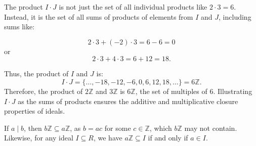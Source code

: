 \noindent
The product $I \cdot J$ is not just the set of all individual products like $2 \cdot 3 = 6$. Instead, it is the set of all sums of products of elements from $I$ and $J$, including sums like:

\[
    2 \cdot 3 + (-2) \cdot 3 = 6 - 6 = 0
\]
or
\[
    2 \cdot 3 + 4 \cdot 3 = 6 + 12 = 18.
\]

Thus, the product of $I$ and $J$ is:
\[
    I \cdot J = \{ \ldots, -18, -12, -6, 0, 6, 12, 18, \ldots \} = 6\mathbb{Z}.
\]
Therefore, the product of $2\mathbb{Z}$ and $3\mathbb{Z}$ is $6\mathbb{Z}$, the set of multiples of 6.
Illustrating $I \cdot J$ as the sums of products ensures the additive and multiplicative closure properties of ideals.
\newpage

\begin{Def}
    If $a \mid b$, then $b\mathbb{Z} \subseteq a\mathbb{Z}$, as $b=ac$
    for some $c \in \mathbb{Z}$, which $b\mathbb{Z}$ may not contain. Likewise, for any ideal $I \subseteq R$, we have $a\mathbb{Z} \subseteq I$ if and only if $a \in I$.
\end{Def}

